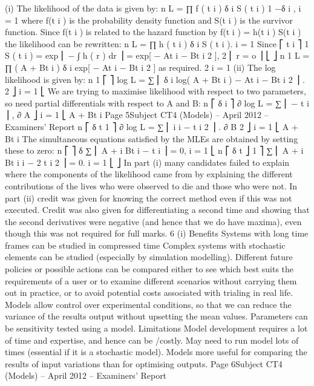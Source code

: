 \documentclass[a4paper,12pt]{article}
\begin{document}
\begin{enumerate}
(i)
The likelihood of the data is given by:
n
L = ∏ f ( t i ) δ i S ( t i ) 1 −δ i ,
i = 1
where f(t i ) is the probability density function and S(t i ) is the survivor function.
Since f(t i ) is related to the hazard function by
f(t i ) = h(t i ) S(t i )
the likelihood can be rewritten:
n
L = ∏ h ( t i ) δ i S ( t i ).
i = 1
Since
⎡ t i
⎤
1
S ( t i ) = exp ⎢ − ∫ h ( r ) dr ⎥ = exp[ − At i − Bt i 2 ],
2
⎢ r = o
⎥
⎣
⎦
n
1
L = ∏ ( A + Bt i ) δ i exp[ − At i − Bt i 2 ] as required.
2
i = 1
(ii)
The log likelihood is given by:
n
1
⎡
⎤
log L = ∑ ⎢ δ i log( A + Bt i ) − At i − Bt i 2 ⎥ .
2
⎦
i = 1 ⎣
We are trying to maximise likelihood with respect to two parameters,
so need partial differentials with respect to A and B:
n
⎡ δ i
⎤
∂
log L = ∑ ⎢
− t i ⎥ ,
∂ A
⎦
i = 1 ⎣ A + Bt i
Page 5Subject CT4 (Models) – April 2012 – Examiners’ Report
n
⎡ δ t
1 ⎤
∂
log L = ∑ ⎢ i i − t i 2 ⎥ .
∂ B
2 ⎦
i = 1 ⎣ A + Bt i
The simultaneous equations satisfied by the MLEs are obtained by
setting these to zero:
n
⎡
⎤
δ
∑ ⎢ A + i Bt i − t i ⎥ = 0,
i = 1 ⎣
n
⎡ δ t
⎦
1
⎤
∑ ⎢ A + i Bt i i − 2 t i 2 ⎥ = 0.
i = 1 ⎣
⎦
In part (i) many candidates failed to explain where the components of the likelihood came
from by explaining the different contributions of the lives who were observed to die and those
who were not. In part (ii) credit was given for knowing the correct method even if this was
not executed. Credit was also given for differentiating a second time and showing that the
second derivatives were negative (and hence that we do have maxima), even though this was
not required for full marks.
6
(i)
Benefits
Systems with long time frames can be studied in compressed time
Complex systems with stochastic elements can be studied (especially by
simulation modelling).
Different future policies or possible actions can be compared either to see which best
suits the requirements of a user or to examine different scenarios without carrying
them out in practice, or to avoid potential costs associated with trialing in real life.
Models allow control over experimental conditions, so that we can reduce the
variance of the results output without upsetting the mean values.
Parameters can be sensitivity tested using a model.
Limitations
Model development requires a lot of time and expertise, and hence can be /costly.
May need to run model lots of times (essential if it is a stochastic model).
Models more useful for comparing the results of input variations than for
optimising outputs.
Page 6Subject CT4 (Models) – April 2012 – Examiners’ Report

\end{enumerate}
\end{document}
